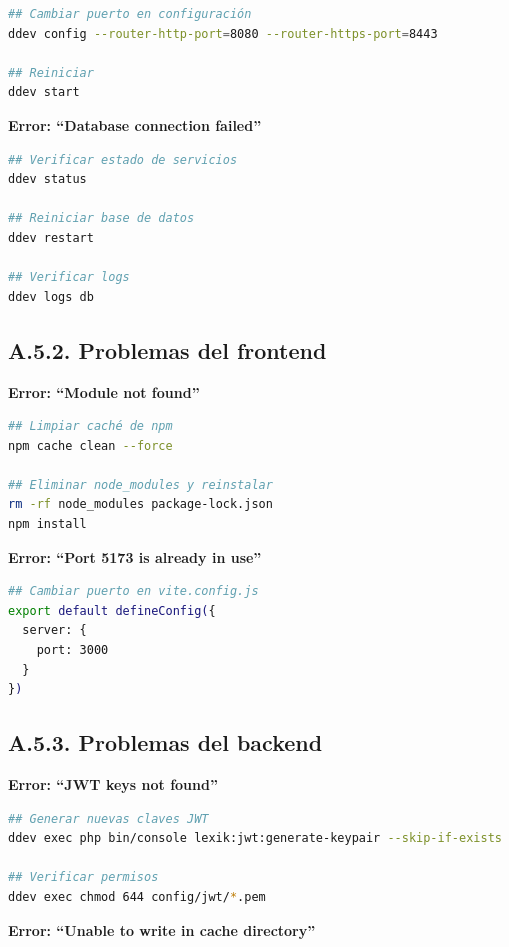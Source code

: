 \documentclass[12pt,a4paper,oneside]{report}
\begin{document}
{\begin{lstlisting}[language=bash]
## Cambiar puerto en configuración
ddev config --router-http-port=8080 --router-https-port=8443

## Reiniciar
ddev start
\end{lstlisting}

\textbf{Error: ``Database connection failed''}

\begin{lstlisting}[language=bash]
## Verificar estado de servicios
ddev status

## Reiniciar base de datos
ddev restart

## Verificar logs
ddev logs db
\end{lstlisting}

\subsection{A.5.2. Problemas del
frontend}\label{a.5.2.-problemas-del-frontend}

\textbf{Error: ``Module not found''}

\begin{lstlisting}[language=bash]
## Limpiar caché de npm
npm cache clean --force

## Eliminar node_modules y reinstalar
rm -rf node_modules package-lock.json
npm install
\end{lstlisting}

\textbf{Error: ``Port 5173 is already in use''}

\begin{lstlisting}[language=bash]
## Cambiar puerto en vite.config.js
export default defineConfig({
  server: {
    port: 3000
  }
})
\end{lstlisting}

\subsection{A.5.3. Problemas del
backend}\label{a.5.3.-problemas-del-backend}

\textbf{Error: ``JWT keys not found''}

\begin{lstlisting}[language=bash]
## Generar nuevas claves JWT
ddev exec php bin/console lexik:jwt:generate-keypair --skip-if-exists

## Verificar permisos
ddev exec chmod 644 config/jwt/*.pem
\end{lstlisting}

\textbf{Error: ``Unable to write in cache directory''}

}
\end{document}
